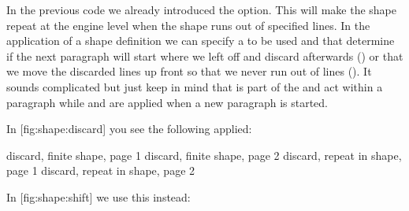 In the previous code we already introduced the  option. This will
make the shape repeat at the engine level when the shape runs out of specified
lines. In the application of a shape definition we can specify a 
to be used and that determine if the next paragraph will start where we left off
and discard afterwards () or that we move the discarded lines up
front so that we never run out of lines (). It sounds complicated
but just keep in mind that  is part of the \type {\parshape} and
act within a paragraph while  and  are applied when a
new paragraph is started.

\startbuffer[demo-1]
\startshapedparagraph[list=test]
\stopshapedparagraph
\stopbuffer

\startshapedparagraph[list=test-repeat]
\stopshapedparagraph
\stopbuffer

In  [fig:shape:discard] you see the following applied:


\startplacefigure[title=Discarded shaping,reference=fig:shape:discard]
 {discard, finite shape,    page 1}
    {} {discard, finite shape,    page 2}
    {} {discard, repeat in shape, page 1}
    {} {discard, repeat in shape, page 2}
\stopcombination
\stopplacefigure

In  [fig:shape:shift] we use this instead:

\startbuffer[demo-2]
\startshapedparagraph[list=test,method=shift]
\stopshapedparagraph
\stopbuffer

\startshapedparagraph[list=test-repeat,method=shift]
\stopshapedparagraph
\stopbuffer

